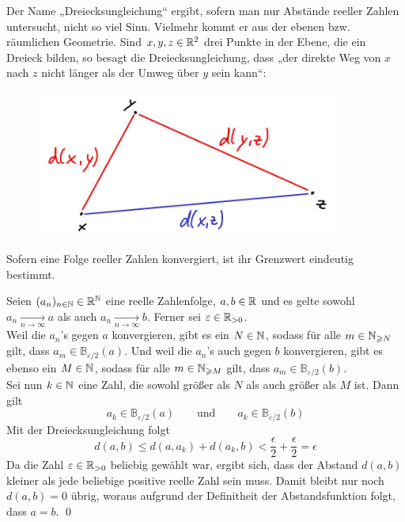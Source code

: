 \begin{bem}
 Der Name „Dreiecksungleichung“ ergibt, sofern man nur Abstände reeller Zahlen untersucht, nicht so viel Sinn. Vielmehr kommt er aus der ebenen bzw. räumlichen Geometrie. Sind $x,y,z\in {\mathbb R}^2$ drei Punkte in der Ebene, die ein Dreieck bilden, so besagt die Dreiecksungleichung, dass „der direkte Weg von $x$ nach $z$ nicht länger als der Umweg über $y$ sein kann“:
     \begin{figure}[H]
\begin{center}
\includegraphics[width=10cm]{./_img/Dreiecksungleichung.jpeg}
\label{zahlenkugel}
\end{center}
\end{figure}
\end{bem}





\begin{sat}
 Sofern eine Folge reeller Zahlen konvergiert, ist ihr Grenzwert eindeutig bestimmt.
\end{sat}
\begin{bew}
Seien $(a_n)_ {n\in {\mathbb N}}\in {\mathbb R}^{\mathbb N}$ eine reelle Zahlenfolge, $a,b\in {\mathbb R}$ und es gelte sowohl $a_n\xrightarrow[n\to \infty]{} a$ als auch $a_n\xrightarrow[n\to \infty]{} b$. Ferner sei $\varepsilon \in {\mathbb R}_{>0}$. \\
Weil die $a_n$'s gegen $a$ konvergieren, gibt es ein $N\in {\mathbb N}$, sodass für alle $m\in {\mathbb N}_{\geqslant N}$ gilt, dass $a_m\in \mathbb{B}_{\varepsilon/2}(a)$. Und weil die $a_n$'s auch gegen $b$ konvergieren, gibt es ebenso ein $M\in {\mathbb N}$, sodass für alle $m\in {\mathbb N}_{\geqslant M}$ gilt, dass $a_m\in \mathbb{B}_{\varepsilon/2}(b)$. \\
Sei nun $k\in {\mathbb N}$ eine Zahl, die sowohl größer als $N$ als auch größer als $M$ ist. Dann gilt
\[ a_k \in \mathbb{B}_{\varepsilon/2}(a) \qquad\text{und}\qquad  a_k \in \mathbb{B}_{\varepsilon/2}(b) \]
Mit der Dreiecksungleichung folgt
\[ d(a,b) \leq d(a,a_k) + d(a_k,b) < \frac{\epsilon}{2}+\frac{\epsilon}{2} = \epsilon \]
Da die Zahl $\varepsilon\in {\mathbb R}_{>0}$ beliebig gewählt war, ergibt sich, dass der Abstand $d(a,b)$ kleiner als jede beliebige positive reelle Zahl sein muss. Damit bleibt nur noch $d(a,b)=0$ übrig, woraus aufgrund der Definitheit der Abstandsfunktion folgt, dass $a=b$. \qed
\end{bew}



